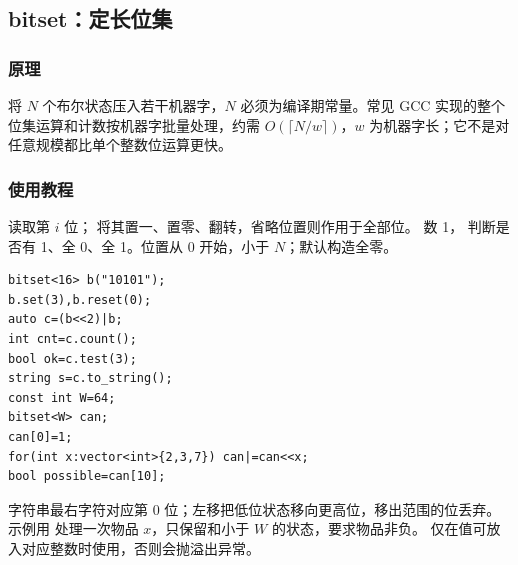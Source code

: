 \subsection{bitset：定长位集}
\label{stl:bitset}
\subsubsection*{原理}
 将 $N$ 个布尔状态压入若干机器字，$N$ 必须为编译期常量。常见 GCC 实现的整个位集运算和计数按机器字批量处理，约需 $O(\lceil N/w\rceil)$，$w$ 为机器字长；它不是对任意规模都比单个整数位运算更快。
\subsubsection*{使用教程}
 读取第 $i$ 位； 将其置一、置零、翻转，省略位置则作用于全部位。 数 1， 判断是否有 1、全 0、全 1。位置从 0 开始，小于 $N$；默认构造全零。
\begin{lstlisting}[style=mtycpp,numbers=none]
bitset<16> b("10101");
b.set(3),b.reset(0);
auto c=(b<<2)|b;
int cnt=c.count();
bool ok=c.test(3);
string s=c.to_string();
const int W=64;
bitset<W> can;
can[0]=1;
for(int x:vector<int>{2,3,7}) can|=can<<x;
bool possible=can[10];
\end{lstlisting}
字符串最右字符对应第 0 位；左移把低位状态移向更高位，移出范围的位丢弃。示例用  处理一次物品 $x$，只保留和小于 $W$ 的状态，要求物品非负。 仅在值可放入对应整数时使用，否则会抛溢出异常。
